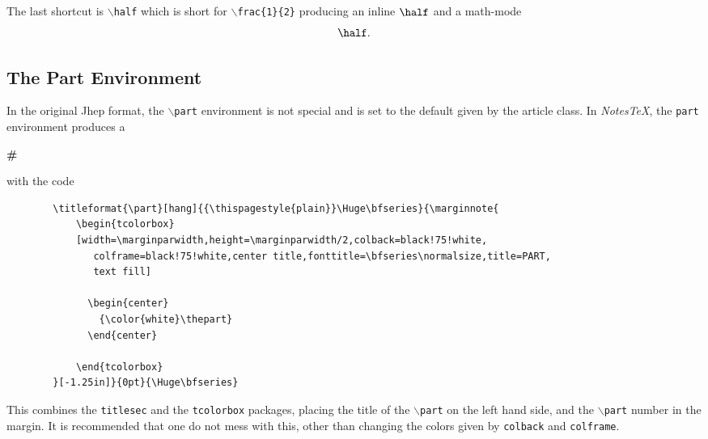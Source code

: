 \documentclass[10pt]{article}
\begin{document}
	The last shortcut is \texttt{$\backslash$half} which is short for \texttt{$\backslash$frac\{1\}\{2\}} producing an inline $\half$ and a math-mode
	\begin{equation*}
		\half.
	\end{equation*}


	\newpage
	\subsection{The Part Environment}
	In the original Jhep format, the \texttt{$\backslash$part} environment is not special and is set to the default given by the article class. In \textit{NotesTeX}, the \texttt{part} environment produces a

	{{\centering
		\begin{tcolorbox}[width=\marginparwidth,height=\marginparwidth/2,colback=black!75!white,colframe=black!75!white,center title,fonttitle=\bfseries\normalsize,title=PART,text fill]
		  \begin{center}
		  {\color{white}\Huge\bfseries\#}
		  \end{center}
		\end{tcolorbox}
	}}
	\noindent with the code
	\begin{verbatim}
		\titleformat{\part}[hang]{{\thispagestyle{plain}}\Huge\bfseries}{\marginnote{
			\begin{tcolorbox}
			[width=\marginparwidth,height=\marginparwidth/2,colback=black!75!white,
			   colframe=black!75!white,center title,fonttitle=\bfseries\normalsize,title=PART,
			   text fill]

			  \begin{center}
			  	{\color{white}\thepart}
			  \end{center}

			\end{tcolorbox}
		}[-1.25in]}{0pt}{\Huge\bfseries}
	\end{verbatim}
	This combines the \texttt{titlesec} and the \texttt{tcolorbox} packages, placing the title of the \texttt{$\backslash$part} on the left hand side, and the \texttt{$\backslash$part} number in the margin. It is recommended that one do not mess with this, other than changing the colors given by \texttt{colback} and \texttt{colframe}.
	\newpage
\end{document}
